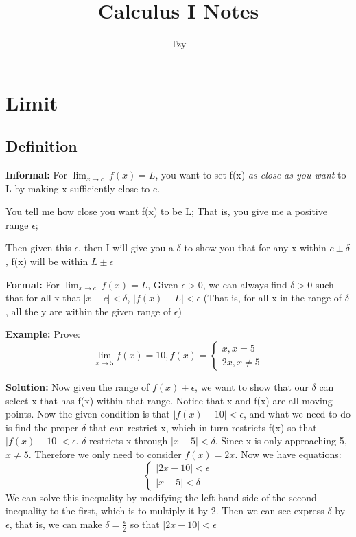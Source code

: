 \documentclass{article}
\author{Tzy}
\title{Calculus I Notes}
\begin{document}
\maketitle{}
\section{Limit}

\subsection{Definition}

\textbf{Informal:} For \(\lim_{x \to c}\ f(x) = L\), you want to set f(x) \textit{as close as you want} to L by making x sufficiently close to c.

You tell me how close you want f(x) to be L; That is, you give me a positive range \(\epsilon\);

Then given this \(\epsilon\), then I will give you a \(\delta\) to show you that for any x within \(c \pm \delta\), f(x) will be within \(L \pm \epsilon\)
 
\textbf{Formal:} For \(\lim_{x \to c}\ f(x) = L\), Given \(\epsilon > 0\), we can always find \(\delta > 0\) such that for all x that \(|x - c| < \delta\), \(|f(x) - L| < \epsilon\) (That is, for all x in the range of \(\delta\), all the y are within the given range of \(\epsilon\))

\textbf{Example:} Prove:
\[
\lim_{x \to 5} f(x) = 10, f(x) = 
\begin{cases}
x, x = 5 \\
2x, x \neq 5
\end{cases}
\]

\textbf{Solution:} Now given the range of \(f(x) \pm \epsilon\), we want to show that our \(\delta\) can select x that has f(x) within that range. Notice that x and f(x) are all moving points. Now the given condition is that \(|f(x) - 10| < \epsilon\), and what we need to do is find the proper \(\delta\) that can restrict x, which in turn restricts f(x) so that \(|f(x) - 10| < \epsilon\). \(\delta\) restricts x through \(|x - 5| < \delta\). Since x is only approaching 5, \(x \neq 5\). Therefore we only need to consider \(f(x) = 2x\). Now we have equations:
\[
\begin{cases}
 |2x - 10| < \epsilon\\
 |x - 5| < \delta
\end{cases}
\]
We can solve this inequality by modifying the left hand side of the second inequality to the first, which is to multiply it by 2. Then we can see express \(\delta\) by \(\epsilon\), that is, we can make \(\delta = \frac{\epsilon}{2}\) so that \(|2x - 10| < \epsilon\)
\end{document}
